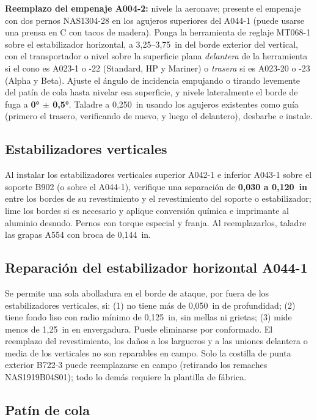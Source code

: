 \textbf{Reemplazo del empenaje A004-2:} nivele la aeronave; presente el empenaje con dos pernos NAS1304-28 en los agujeros superiores del A044-1 (puede usarse una prensa en C con tacos de madera). Ponga la herramienta de reglaje MT068-1 sobre el estabilizador horizontal, a 3,25--3,75~in del borde exterior del vertical, con el transportador o nivel sobre la superficie plana \emph{delantera} de la herramienta si el cono es A023-1 o -22 (Standard, HP y Mariner) o \emph{trasera} si es A023-20 o -23 (Alpha y Beta). Ajuste el ángulo de incidencia empujando o tirando levemente del patín de cola hasta nivelar esa superficie, y nivele lateralmente el borde de fuga a \textbf{0° $\pm$ 0,5°}. Taladre a 0,250~in usando los agujeros existentes como guía (primero el trasero, verificando de nuevo, y luego el delantero), desbarbe e instale.

\subsection{Estabilizadores verticales}

Al instalar los estabilizadores verticales superior A042-1 e inferior A043-1 sobre el soporte B902 (o sobre el A044-1), verifique una separación de \textbf{0,030 a 0,120~in} entre los bordes de su revestimiento y el revestimiento del soporte o estabilizador; lime los bordes si es necesario y aplique conversión química e imprimante al aluminio desnudo. Pernos con torque especial y franja. Al reemplazarlos, taladre las grapas A554 con broca de 0,144~in.

\subsection{Reparación del estabilizador horizontal A044-1}

Se permite una sola abolladura en el borde de ataque, por fuera de los estabilizadores verticales, si: (1) no tiene más de 0,050~in de profundidad; (2) tiene fondo liso con radio mínimo de 0,125~in, sin mellas ni grietas; (3) mide menos de 1,25~in en envergadura. Puede eliminarse por conformado. El reemplazo del revestimiento, los daños a los largueros y a las uniones delantera o media de los verticales no son reparables en campo. Solo la costilla de punta exterior B722-3 puede reemplazarse en campo (retirando los remaches NAS1919B04S01); todo lo demás requiere la plantilla de fábrica.

\subsection{Patín de cola}

